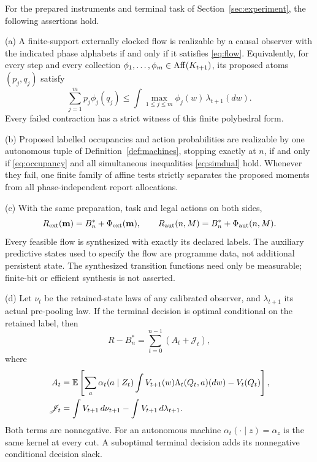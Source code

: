 \begin{theorem}\label{thm:completion}
For the prepared instruments and terminal task of Section~\ref{sec:experiment}, the following assertions hold.

\textup{(a)} A finite-support externally clocked flow is realizable by a causal observer with the indicated phase alphabets if and only if it satisfies \eqref{eq:flow}. Equivalently, for every step and every collection $\phi_1,\ldots,\phi_m\in\operatorname{Aff}(K_{t+1})$, its proposed atoms $(p_j,q_j)$ satisfy
\begin{equation}\label{eq:localdual}
 \sum_{j=1}^m p_j\phi_j(q_j)
 \le\int\max_{1\le j\le m}\phi_j(w)\,\lambda_{t+1}(dw).
\end{equation}
Every failed contraction has a strict witness of this finite polyhedral form.

\textup{(b)} Proposed labelled occupancies and action probabilities are realizable by one autonomous tuple of Definition~\ref{def:machines}, stopping exactly at $n$, if and only if \eqref{eq:occupancy} and all simultaneous inequalities \eqref{eq:simdual} hold. Whenever they fail, one finite family of affine tests strictly separates the proposed moments from all phase-independent report allocations.

\textup{(c)} With the same preparation, task and legal actions on both sides,
\begin{equation}\label{eq:exactrisk}
 R_{\mathrm{ext}}(\mathbf m)=B_n^*+\Phi_{\mathrm{ext}}(\mathbf m),\qquad
 R_{\mathrm{aut}}(n,M)=B_n^*+\Phi_{\mathrm{aut}}(n,M).
\end{equation}
Every feasible flow is synthesized with exactly its declared labels. The auxiliary predictive states used to specify the flow are programme data, not additional persistent state. The synthesized transition functions need only be measurable; finite-bit or efficient synthesis is not asserted.

\textup{(d)} Let $\nu_t$ be the retained-state laws of any calibrated observer, and $\lambda_{t+1}$ its actual pre-pooling law. If the terminal decision is optimal conditional on the retained label, then
\begin{equation}\label{eq:slack}
 R-B_n^*=\sum_{t=0}^{n-1}(A_t+\mathscr J_t),
\end{equation}
where
\begin{align*}
 A_t&=\mathbb E\left[\sum_a\alpha_t(a\mid Z_t)
       \int V_{t+1}(w)\Lambda_t(Q_t,a)(dw)-V_t(Q_t)\right],\\
 \mathscr J_t&=\int V_{t+1}\,d\nu_{t+1}-\int V_{t+1}\,d\lambda_{t+1}.
\end{align*}
Both terms are nonnegative. For an autonomous machine $\alpha_t(\cdot\mid z)=\alpha_z$ is the same kernel at every cut. A suboptimal terminal decision adds its nonnegative conditional decision slack.


\end{theorem}
